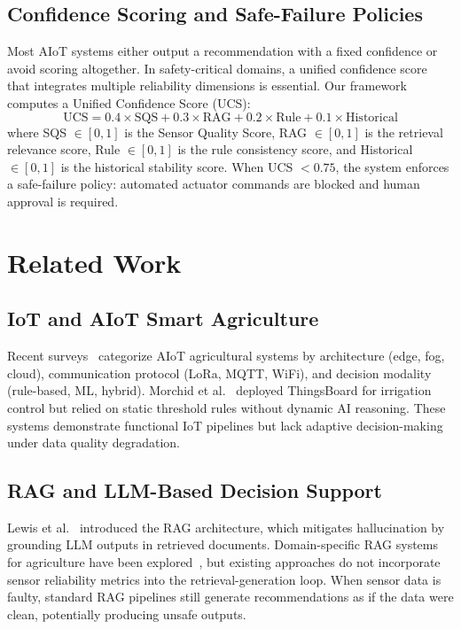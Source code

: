 \documentclass[runningheads]{llncs}
\begin{document}
\subsection{Confidence Scoring and Safe-Failure Policies}
Most AIoT systems either output a recommendation with a fixed confidence or avoid scoring altogether. In safety-critical domains, a unified confidence score that integrates multiple reliability dimensions is essential. Our framework computes a Unified Confidence Score (UCS):
\begin{equation}
\text{UCS} = 0.4 \times \text{SQS} + 0.3 \times \text{RAG} + 0.2 \times \text{Rule} + 0.1 \times \text{Historical}
\label{eq:ucs}
\end{equation}
where SQS $\in [0,1]$ is the Sensor Quality Score, RAG $\in [0,1]$ is the retrieval relevance score, Rule $\in [0,1]$ is the rule consistency score, and Historical $\in [0,1]$ is the historical stability score. When UCS $< 0.75$, the system enforces a safe-failure policy: automated actuator commands are blocked and human approval is required.

\section{Related Work}

\subsection{IoT and AIoT Smart Agriculture}
Recent surveys~\cite{dalhatu2023aiot} categorize AIoT agricultural systems by architecture (edge, fog, cloud), communication protocol (LoRa, MQTT, WiFi), and decision modality (rule-based, ML, hybrid). Morchid et al.~\cite{morchid2024thingsboard} deployed ThingsBoard for irrigation control but relied on static threshold rules without dynamic AI reasoning. These systems demonstrate functional IoT pipelines but lack adaptive decision-making under data quality degradation.

\subsection{RAG and LLM-Based Decision Support}
Lewis et al.~\cite{lewis2020rag} introduced the RAG architecture, which mitigates hallucination by grounding LLM outputs in retrieved documents. Domain-specific RAG systems for agriculture have been explored~\cite{agriir2026}, but existing approaches do not incorporate sensor reliability metrics into the retrieval-generation loop. When sensor data is faulty, standard RAG pipelines still generate recommendations as if the data were clean, potentially producing unsafe outputs.
\end{document}
